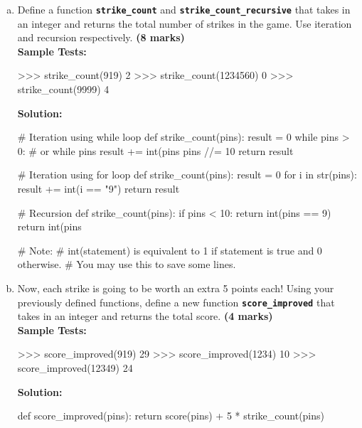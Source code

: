 \begin{enumerate}[(a)]
\item Define a function \texttt{\bfseries strike\_count} and \texttt{\bfseries strike\_count\_recursive} that takes in
an integer and returns the total number of strikes in the game. Use iteration and recursion respectively. \textbf{(8 marks)} \\
\textbf{Sample Tests:}
\begin{python}
>>> strike_count(919)
2
>>> strike_count(1234560)
0
>>> strike_count(9999)
4
\end{python}
\textbf{Solution:}
\begin{python}
# Iteration using while loop
def strike_count(pins):
    result = 0
    while pins > 0: # or while pins
        result += int(pins %
        pins //= 10
    return result

# Iteration using for loop
def strike_count(pins):
    result = 0
    for i in str(pins):
        result += int(i == "9")
    return result

# Recursion
def strike_count(pins):
    if pins < 10:
        return int(pins == 9)
    return int(pins %

# Note:
# int(statement) is equivalent to 1 if statement is true and 0 otherwise.
# You may use this to save some lines.
\end{python}

\item Now, each strike is going to be worth an extra 5 points each! Using your previously
defined functions, define a new function \texttt{\bfseries score\_improved} that takes in an integer and
returns the total score. \textbf{(4 marks)} \\
\textbf{Sample Tests:}
\begin{python}
>>> score_improved(919)
29
>>> score_improved(1234)
10
>>> score_improved(12349)
24
\end{python}
\textbf{Solution:}
\begin{python}
def score_improved(pins):
    return score(pins) + 5 * strike_count(pins)
\end{python}
\end{enumerate}

